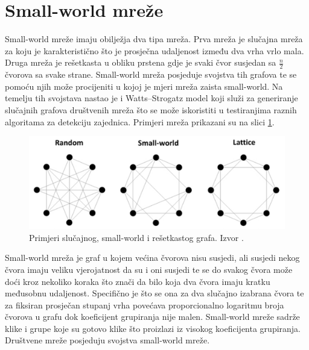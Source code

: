 \documentclass[times, utf8, diplomski]{fer}
\begin{document}
\section{Small-world mreže} \label{small-world}

Small-world mreže imaju obilježja dva tipa mreža. Prva mreža je slučajna mreža za koju je karakteristično što je prosječna udaljenost između dva vrha vrlo mala. Druga mreža je rešetkasta u obliku prstena gdje je svaki čvor susjedan sa $\frac{n}{2}$ čvorova sa svake strane. Small-world mreža posjeduje svojstva tih grafova te se pomoću njih može procijeniti u kojoj je mjeri mreža zaista small-world. Na temelju tih svojstava nastao je i Watts–Strogatz model koji služi za generiranje slučajnih grafova društvenih mreža što se može iskoristiti u testiranjima raznih algoritama za detekciju zajednica. Primjeri mreža prikazani su na slici \ref{fig:small-world}.

\begin{figure}
	\includegraphics[width=\linewidth]{images/small-world.png}
	\caption{Primjeri slučajnog, small-world i rešetkastog grafa. Izvor \cite{article_2015}.}
	\label{fig:small-world}
\end{figure}

Small-world mreža je graf u kojem većina čvorova nisu susjedi, ali susjedi nekog čvora imaju veliku vjerojatnost da su i oni susjedi te se do svakog čvora može doći kroz nekoliko koraka što znači da bilo koja dva čvora imaju kratku međusobnu udaljenost. Specifično je što se ona za dva slučajno izabrana čvora te za fiksiran prosječan stupanj vrha povećava proporcionalno logaritmu broja čvorova u grafu dok koeficijent grupiranja nije malen. Small-world mreže sadrže klike i grupe koje su gotovo klike što proizlazi iz visokog koeficijenta grupiranja. Društvene mreže posjeduju svojstva small-world mreže.
\end{document}
